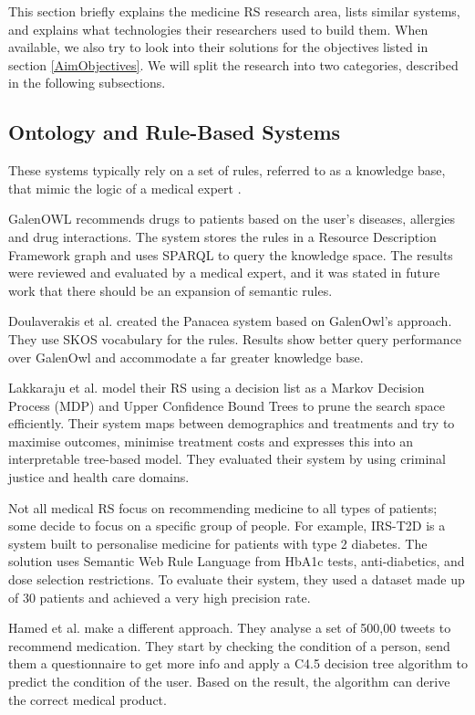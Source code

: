This section briefly explains the medicine RS research area, lists similar
systems, and explains what technologies their researchers used to build
them. When available, we also try to look into their solutions for the
objectives listed in section \ref{AimObjectives}. We will split the
research into two categories, described in the following subsections.

\subsection{Ontology and Rule-Based Systems}

These systems typically rely on a set of rules, referred to as a knowledge
base, that mimic the logic of a medical expert \cite{Stark2019}.

GalenOWL \cite{Doulaverakis2012} recommends drugs to patients based on the
user's diseases, allergies and drug interactions. The system stores the
rules in a Resource Description Framework graph and uses SPARQL to query
the knowledge space. The results were reviewed and evaluated by a medical
expert, and it was stated in future work that there should be an expansion
of semantic rules. 

Doulaverakis et al. created the Panacea \cite{Doulaverakis2014} system based on
GalenOwl's approach. They use SKOS vocabulary for the rules. Results show
better query performance over GalenOwl and accommodate a far greater knowledge
base.


Lakkaraju et al.\cite{Lakkaraju2017} model their RS using a decision list
as a Markov Decision Process (MDP) and Upper Confidence Bound Trees to
prune the search space efficiently. Their system maps between demographics
and treatments and try to maximise outcomes, minimise treatment costs and
expresses this into an interpretable tree-based model. They evaluated
their system by using criminal justice and health care domains. 


Not all medical RS focus on recommending medicine to all types of
patients; some decide to focus on a specific group of people. For example,
IRS-T2D \cite{Mahmoud2016} is a system built to personalise medicine for
patients with type 2 diabetes. The solution uses Semantic Web Rule Language
from HbA1c  tests, anti-diabetics, and dose selection restrictions. To evaluate
their system, they used a dataset made up of 30 patients and achieved a very
high precision rate. 

Hamed et al. \cite{Hamed2012} make a different approach. They analyse a set of
500,00 tweets to recommend medication. They start by checking the condition of
a person, send them a questionnaire to get more info and apply a C4.5 decision
tree algorithm to predict the condition of the user. Based on the result, the
algorithm can derive the correct medical product. 

